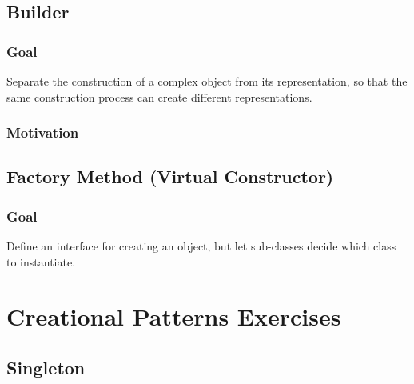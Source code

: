 \documentclass{article}
\begin{document}
\subsection{Builder}
\subsubsection{Goal}
Separate the construction of a complex object from its representation, so that the same construction process can create different representations.

\subsubsection{Motivation}



\subsection{Factory Method (Virtual Constructor)}
\subsubsection{Goal}
Define an interface for creating an object, but let sub-classes decide which class to instantiate.




\section{Creational Patterns Exercises}
\subsection{Singleton}
\end{document}
